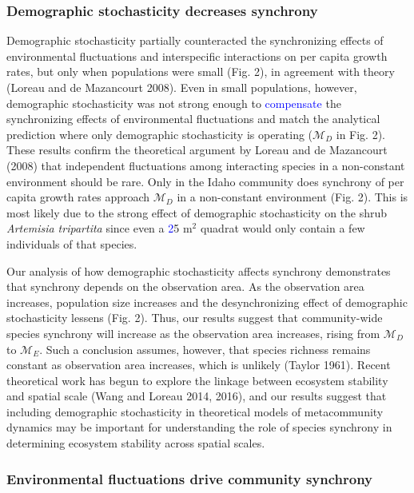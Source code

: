 \documentclass[12pt,]{article}
\begin{document}
\subsubsection{Demographic stochasticity decreases
synchrony}\label{demographic-stochasticity-decreases-synchrony}

Demographic stochasticity partially counteracted the synchronizing
effects of environmental fluctuations and interspecific interactions on
per capita growth rates, but only when populations were small (Fig. 2),
in agreement with theory (Loreau and {{de Mazancourt}} 2008). Even in
small populations, however, demographic stochasticity was not strong
enough to \textcolor{blue}{compensate} the synchronizing effects of
environmental fluctuations and match the analytical prediction where
only demographic stochasticity is operating (\(\mathcal{M}_D\) in Fig.
2). These results confirm the theoretical argument by Loreau and {{de
Mazancourt}} (2008) that independent fluctuations among interacting
species in a non-constant environment should be rare. Only in the Idaho
community does synchrony of per capita growth rates approach
\(\mathcal{M}_D\) in a non-constant environment (Fig. 2). This is most
likely due to the strong effect of demographic stochasticity on the
shrub \emph{Artemisia tripartita} since even a \textcolor{blue}{2}5
\(\text{m}^2\) quadrat would only contain a few individuals of that
species.

Our analysis of how demographic stochasticity affects synchrony
demonstrates that synchrony depends on the observation area. As the
observation area increases, population size increases and the
desynchronizing effect of demographic stochasticity lessens (Fig. 2).
Thus, our results suggest that community-wide species synchrony will
increase as the observation area increases, rising from
\(\mathcal{M}_D\) to \(\mathcal{M}_E\). Such a conclusion assumes,
however, that species richness remains constant as observation area
increases, which is unlikely (Taylor 1961). Recent theoretical work has
begun to explore the linkage between ecosystem stability and spatial
scale (Wang and Loreau 2014, 2016), and our results suggest that
including demographic stochasticity in theoretical models of
metacommunity dynamics may be important for understanding the role of
species synchrony in determining ecosystem stability across spatial
scales.

\subsubsection{Environmental fluctuations drive community
synchrony}\label{environmental-fluctuations-drive-community-synchrony}
\end{document}
